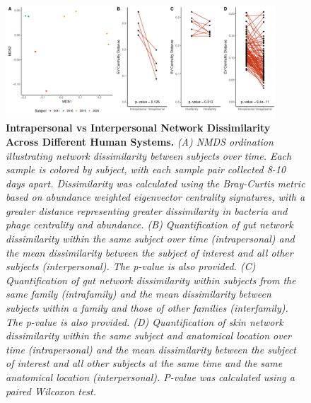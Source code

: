 \documentclass[12pt,]{article}
\begin{document}
\begin{figure}[htbp]
\centering
\includegraphics[width=0.90000\textwidth]{../figures/intrapersonal_diversity.pdf}
\caption{\textbf{Intrapersonal vs Interpersonal Network Dissimilarity
Across Different Human Systems.} \emph{(A) NMDS ordination illustrating
network dissimilarity between subjects over time. Each sample is colored
by subject, with each sample pair collected 8-10 days apart.
Dissimilarity was calculated using the Bray-Curtis metric based on
abundance weighted eigenvector centrality signatures, with a greater
distance representing greater dissimilarity in bacteria and phage
centrality and abundance. (B) Quantification of gut network
dissimilarity within the same subject over time (intrapersonal) and the
mean dissimilarity between the subject of interest and all other
subjects (interpersonal). The p-value is also provided. (C)
Quantification of gut network dissimilarity within subjects from the
same family (intrafamily) and the mean dissimilarity between subjects
within a family and those of other families (interfamily). The p-value
is also provided. (D) Quantification of skin network dissimilarity
within the same subject and anatomical location over time
(intrapersonal) and the mean dissimilarity between the subject of
interest and all other subjects at the same time and the same anatomical
location (interpersonal). P-value was calculated using a paired Wilcoxon
test.}\label{intradiv}}
\end{figure}
\end{document}
